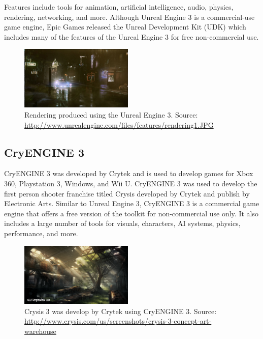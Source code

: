 Features include tools for animation, artificial intelligence, audio, physics, rendering, networking, and more. Although Unreal Engine 3 is a commercial-use game engine, Epic Games released the Unreal Development Kit (UDK) which includes many of the features of the Unreal Engine 3 for free non-commercial use.

\begin{figure}[h!]
  \centering \includegraphics[width=0.48\textwidth]{Images/unreal_engine3_rendering.jpg}
	\caption{Rendering produced using the Unreal Engine 3. Source: \url{http://www.unrealengine.com/files/features/rendering1.JPG}}
\end{figure}

\subsection{CryENGINE 3}
CryENGINE 3 was developed by Crytek and is used to develop games for Xbox 360, Playstation 3, Windows, and Wii U. CryENGINE 3 was used to develop the first person shooter franchise titled Crysis developed by Crytek and publish by Electronic Arts. Similar to Unreal Engine 3, CryENGINE 3 is a commercial game engine that offers a free version of the toolkit for non-commercial use only. It also includes a large number of tools for visuals, characters, AI systems, physics, performance, and more.
\begin{figure}[h!]
  \centering \includegraphics[width=0.48\textwidth]{Images/Crysis3_Fields_Warehouse_ConceptArt.png}
	\caption{Crysis 3 was develop by Crytek using CryENGINE 3. Source: \url{http://www.crysis.com/us/screenshots/crysis-3-concept-art-warehouse}}
\end{figure}

